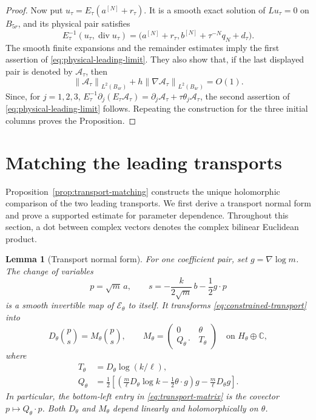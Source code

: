 \documentclass[11pt]{article}
\newcommand{\C}{\mathbb C}
\DeclareMathOperator{\diverg}{div}
\newcommand{\norm}[1]{\left\lVert #1\right\rVert}
\newcommand{\Ecal}{\mathcal E}
\newtheorem{lemma}[theorem]{Lemma}
\theoremstyle{remark}
\numberwithin{equation}{section}
\begin{document}
\begin{proof}
Now put $u_\tau=E_\tau(a^{[N]}+r_\tau)$. It is a smooth exact
solution of $Lu_\tau=0$ on $B_{5r}$, and its physical pair
satisfies
\[
 E_\tau^{-1}(u_\tau,\diverg u_\tau)
  =\bigl(a^{[N]}+r_\tau,
         b^{[N]}+\tau^{-N}q_N+d_\tau\bigr).
\]
The smooth finite expansions and the remainder estimates imply
the first assertion of \eqref{eq:physical-leading-limit}.
They also show that, if the last displayed pair is denoted
by $\mathcal A_\tau$, then
\[
 \norm{\mathcal A_\tau}_{L^2(B_{4r})}
       +h\norm{\nabla\mathcal A_\tau}_{L^2(B_{4r})}=O(1).
\]
Since, for $j=1,2,3$,
$E_\tau^{-1}\partial_j(E_\tau\mathcal A_\tau)
=\partial_j\mathcal A_\tau+\tau\theta_j\mathcal A_\tau$,
the second assertion of \eqref{eq:physical-leading-limit}
follows. Repeating the construction for the three initial
columns proves the Proposition.
\end{proof}

\section{Matching the leading transports}\label{sec:transport-matching}

Proposition~\ref{prop:transport-matching} constructs the unique holomorphic
comparison of the two leading transports. We first derive a transport normal
form and prove a supported estimate for parameter dependence.
Throughout this section, a dot
between complex vectors denotes the complex bilinear Euclidean product.

\begin{lemma}[Transport normal form]\label{lem:transport-normal-form}
For one coefficient pair, set $g=\nabla\log m$. The change of variables
\begin{equation}\label{eq:transport-change}
 p=\sqrt m\,a,
 \qquad
 s=-\frac{k}{2\sqrt m}\,b-\frac12 g\cdot p
\end{equation}
is a smooth invertible map of $\Ecal_\theta$ to itself. It transforms
\eqref{eq:constrained-transport} into
\begin{equation}\label{eq:transport-matrix}
 D_\theta\binom{p}{s}
   =M_\theta\binom{p}{s},
 \qquad
 M_\theta=
 \begin{pmatrix}
  0&\theta\\
  Q_\theta\cdot&T_\theta
 \end{pmatrix}
 \quad\text{on }H_\theta\oplus\C,
\end{equation}
where
\begin{equation}\label{eq:transport-coefficients}
 \begin{aligned}
  T_\theta&=D_\theta\log(k/\ell),\\
  Q_\theta&=\frac12\left[
   \left(\frac m\ell D_\theta\log k
          -\frac12\theta\cdot g\right)g
         -\frac m\ell D_\theta g\right].
 \end{aligned}
\end{equation}
In particular, the bottom-left entry in \eqref{eq:transport-matrix}
is the covector $p\mapsto Q_\theta\cdot p$. Both $D_\theta$ and
$M_\theta$ depend linearly and holomorphically on $\theta$.
\end{lemma}
\end{document}
